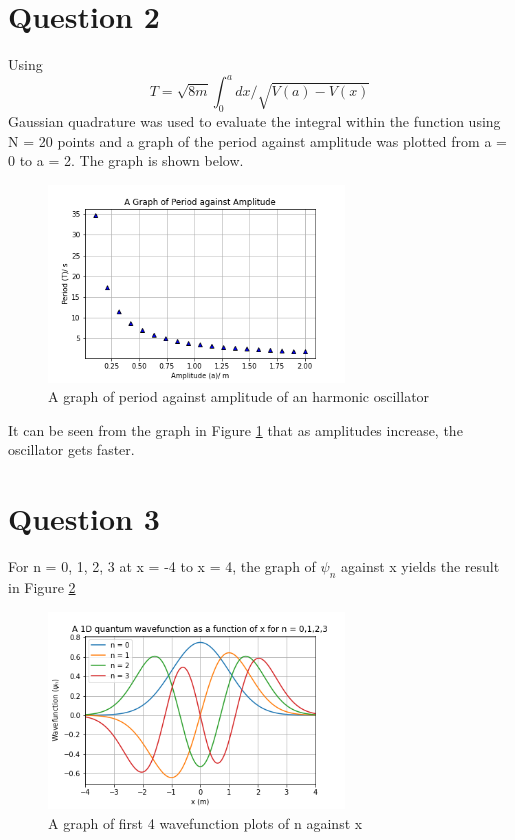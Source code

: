 \documentclass[11pt]{article}
\begin{document}
\section{Question 2}
Using 
\begin{equation}
	T = \sqrt{8m}\int_{0}^{a} dx/\sqrt{V(a) - V(x)}
\end{equation}
Gaussian quadrature was used to evaluate the integral within the function using N = 20 points and a graph of the period against amplitude was plotted from a = 0 to a = 2. 
The graph is shown below.
\begin{figure}[!h]\begin{center} 
		\vspace{12pt}
		\includegraphics[width=0.7\textwidth]{anharmonic period.png}
		\caption{A graph of period against amplitude of an harmonic oscillator }
		\label{fig:anharmonic_period} 
	\end{center}
\end{figure} 

It can be seen from the graph in Figure \ref{fig:anharmonic_period}  that as amplitudes increase, the oscillator gets faster.

\section{Question 3}

For n = 0, 1, 2, 3 at x = -4 to x = 4, the graph of $\psi_{n}$ against x yields the result in Figure \ref{fig:oscillator_multiple_n}
\begin{figure}[!h]\begin{center} 
		\vspace{12pt}
		\includegraphics[width=0.7\textwidth]{oscillator_wavefuntion_multiple_n.png} 
		\caption{A graph of first 4 wavefunction plots of n against x}
		\label{fig:oscillator_multiple_n}
	\end{center}
\end{figure}
\end{document}
